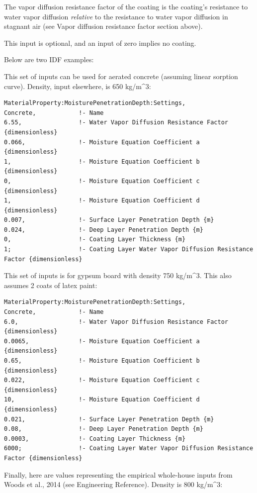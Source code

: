 The vapor diffusion resistance factor of the coating is the coating's
resistance to water vapor diffusion \emph{relative} to the resistance to
water vapor diffusion in stagnant air (see Vapor diffusion resistance
factor section above).

This input is optional, and an input of zero implies no coating.

Below are two IDF examples:

This set of inputs can be used for aerated concrete (assuming linear
sorption curve). Density, input elsewhere, is 650 kg/m\^{}3:

\begin{lstlisting}
MaterialProperty:MoisturePenetrationDepth:Settings,
Concrete,            !- Name
6.55,                !- Water Vapor Diffusion Resistance Factor {dimensionless}
0.066,               !- Moisture Equation Coefficient a {dimensionless}
1,                   !- Moisture Equation Coefficient b {dimensionless}
0,                   !- Moisture Equation Coefficient c {dimensionless}
1,                   !- Moisture Equation Coefficient d {dimensionless}
0.007,               !- Surface Layer Penetration Depth {m}
0.024,               !- Deep Layer Penetration Depth {m}
0,                   !- Coating Layer Thickness {m}
1;                   !- Coating Layer Water Vapor Diffusion Resistance Factor {dimensionless}
\end{lstlisting}

This set of inputs is for gypsum board with density 750 kg/m\^{}3. This
also assumes 2 coats of latex paint:

\begin{lstlisting}
MaterialProperty:MoisturePenetrationDepth:Settings,
Concrete,            !- Name
6.0,                 !- Water Vapor Diffusion Resistance Factor {dimensionless}
0.0065,              !- Moisture Equation Coefficient a {dimensionless}
0.65,                !- Moisture Equation Coefficient b {dimensionless}
0.022,               !- Moisture Equation Coefficient c {dimensionless}
10,                  !- Moisture Equation Coefficient d {dimensionless}
0.021,               !- Surface Layer Penetration Depth {m}
0.08,                !- Deep Layer Penetration Depth {m}
0.0003,              !- Coating Layer Thickness {m}
6000;                !- Coating Layer Water Vapor Diffusion Resistance Factor {dimensionless}
\end{lstlisting}

Finally, here are values representing the empirical whole-house inputs
from Woods et al., 2014 (see Engineering Reference). Density is 800
kg/m\^{}3:

